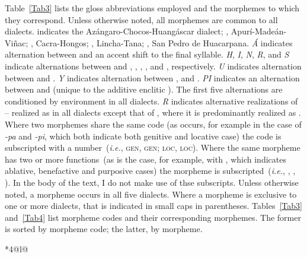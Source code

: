 \label{ch:notconv}
\begin{refsection}
Table~\ref{Tab3} lists the gloss abbreviations employed and the morphemes to which they correspond. Unless otherwise noted, all morphemes are common to all dialects. \ACH{} indicates the Az\'angaro-Chocos-Huang\'ascar dialect; \AMV{}, Apur\'i-Made\'an-Vi\~nac; \CH{}, Cacra-Hongos; \LT{}, Lincha-Tana; \SP{}, San Pedro de Huacarpana. \textit{\'A} indicates alternation between \textipa{[\'a]} and an accent shift to the final syllable. \textit{H}, \textit{I}, \textit{N}, \textit{R}, and \textit{S} indicate alternations between \textipa{[\o]} and \textipa{[h]}, \textipa{[i]}, \textipa{[n]}, \textipa{[r]}, and \textipa{[s]}, respectively. \textit{U} indicates alternation between \textipa{[u]} and \textipa{[a]}. \textit{Y} indicates alternation between \textipa{[y]}, \textipa{[i]} and \textipa{[\o]}. \textit{PI} indicates an alternation between \textipa{[pi]} and \textipa{[\o]} (unique to the additive enclitic ). The first five alternations are conditioned by environment in all dialects. \textit{R} indicates alternative realizations of  -- realized as \textipa{[r]} in all dialects except that of \CH{}, where it is predominantly realized as \textipa{[l]}. Where two morphemes share the same code (as occurs, for example in the case of \mbox{\textit{-pa}} and \mbox{\textit{-pi}}, which both indicate both genitive and locative case) the code is subscripted with a number~(\emph{i.e.}, \textsc{gen}, \textsc{gen}; \textsc{loc}, \textsc{loc}). Where the same morpheme has two or more functions~(as is the case, for example, with , which indicates ablative, benefactive and purposive cases) the morpheme is subscripted~(\emph{i.e.}, , , ). In the body of the text, I do not make use of thse subscripts. Unless otherwise noted, a morpheme occurs in all five dialects. Where a morpheme is exclusive to one or more dialects, that is indicated in small caps in parentheses. Tables~\ref{Tab3} and~\ref{Tab4} list morpheme codes and their corresponding morphemes. The former is sorted by morpheme code; the latter, by morpheme.

\begin{small}
\begin{longtable}{*{4}{@{\hspace{1ex}}l}@{\hspace{1ex}}}
\caption{Morpheme codes~(sorted by code)}\label{Tab3}


\end{longtable}
\end{small}
\end{refsection}
